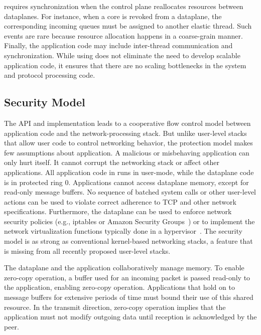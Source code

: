 \ix requires synchronization when the control plane reallocates
resources between dataplanes.  For instance, when a core is revoked
from a dataplane, the corresponding incoming queues must be assigned
to another elastic thread. Such events are rare because resource
allocation happens in a coarse-grain manner. Finally, the application
code may include inter-thread communication and synchronization. While
using \ix does not eliminate the need to develop scalable application
code, it ensures that there are no scaling bottlenecks in the system
and protocol processing code.

\subsection{Security Model}
\label{sec:impl:coop}


The \ix API and implementation leads to a cooperative flow control
model between application code and the network-processing stack.  But
unlike user-level stacks that allow user code to control networking
behavior, the \ix protection model makes few assumptions about
application. A malicious or misbehaving application can only hurt
itself. It cannot corrupt the networking stack or affect other
applications. All application code in \ix runs in user-mode, while the
dataplane code is in protected ring 0. Applications cannot access
dataplane memory, except for read-only message buffers.  No sequence
of batched system calls or other user-level actions can be used to
violate correct adherence to TCP and other network specifications.
Furthermore, the dataplane can be used to enforce network security
policies (e.g., iptables or Amazon Security
Groups~\cite{url:amazon-sg}) or to implement the network
virtualization functions typically done in a
hypervisor~\cite{nsdi:nsx}. The \ix security model is as strong as
conventional kernel-based networking stacks, a feature that is missing
from all recently proposed user-level stacks.

The \ix dataplane and the application collaboratively manage
memory. To enable zero-copy operation, a buffer used for an incoming
packet is passed read-only to the application, enabling zero-copy
operation. Applications that hold on to message buffers for extensive
periods of time must bound their use of this shared resource.  In the
transmit direction, zero-copy operation implies that the application
must not modify outgoing data until reception is acknowledged by the
peer.

